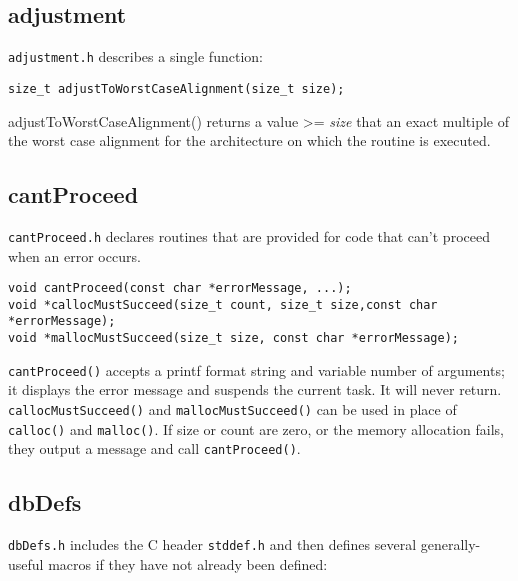 \subsection{adjustment}

\verb|adjustment.h| describes a single function:

\begin{verbatim}
size_t adjustToWorstCaseAlignment(size_t size);
\end{verbatim}

adjustToWorstCaseAlignment() returns a value \textgreater{}= \emph{size} that an exact multiple of the worst case alignment for the architecture on which the routine is executed.

\subsection{cantProceed}

\verb|cantProceed.h| declares routines that are provided for code that can't proceed when an error occurs.

\begin{verbatim}
void cantProceed(const char *errorMessage, ...);
void *callocMustSucceed(size_t count, size_t size,const char *errorMessage);
void *mallocMustSucceed(size_t size, const char *errorMessage);
\end{verbatim}

\verb|cantProceed()| accepts a printf format string and variable number of arguments; it displays the error message and suspends the current task.
It will never return.
\verb|callocMustSucceed()| and \verb|mallocMustSucceed()| can be used in place of \verb|calloc()| and \verb|malloc()|.
If size or count are zero, or the memory allocation fails, they output a message and call \verb|cantProceed()|.

\subsection{dbDefs}
\verb|dbDefs.h| includes the C header \verb|stddef.h| and then defines several generally-useful macros if they have not already been defined:

